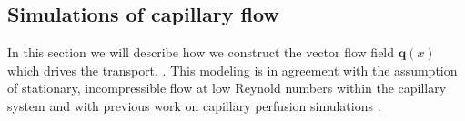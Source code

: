 \documentclass[journal,twocolumn]{IEEEtran}
\newcommand{\vq}{\mathbf{q}}
\begin{document}
	

	\subsection{Simulations of capillary flow}\label{sec:flow}
	In this section we will describe how we construct the vector flow field $\vq(x)$ which drives the transport.
.
	This modeling is in agreement with the assumption of stationary, incompressible flow at low Reynold numbers within the capillary system \cite{Cho2011} and with previous work on capillary perfusion simulations \cite{Cookson2012,Michler2013}. 
\end{document}
